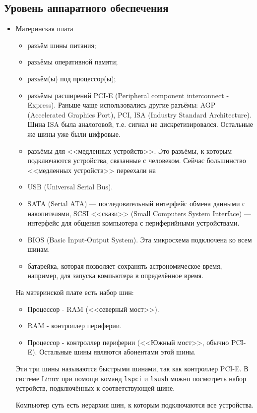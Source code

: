 \subsection{Уровень аппаратного обеспечения}

\begin{itemize}
\item Материнская плата
\begin{itemize}
\item разъём шины питания;
\item разъёмы оперативной памяти;
\item разъём(ы) под процессор(ы);
\item разъёмы расширений PCI-E (Peripheral component interconnect - Express). Раньше чаще использовались другие разъёмы: AGP (Accelerated Graphics Port), PCI, ISA (Industry Standard Architecture). Шина ISA была аналоговой, т.е. сигнал не дискретизировался. Остальные же шины уже были цифровые.
\item разъёмы для <<медленных устройств>>. Это разъёмы, к которым подключаются устройства, связанные с человеком. Сейчас большинство <<медленных устройств>> переехали на
\item USB (Universal Serial Bus).
\item SATA (Serial ATA) --- последовательный интерфейс обмена данными с накопителями, SCSI <<скази>> (Small Computers System Interface) --- интерфейс для общения компьютера с периферийными устройствами.
\item BIOS (Basic Input-Output System). Эта микросхема подключена ко всем шинам. 
\item батарейка, которая позволяет сохранять астрономическое время, например, для запуска компьютера в определённое время.
\end{itemize}
На материнской плате есть набор шин:
\begin{itemize}
\item Процессор - RAM (<<северный мост>>).
\item RAM - контроллер периферии.
\item Процессор - контроллер периферии (<<Южный мост>>, обычно PCI-E). Остальные шины являются абонентами этой шины.
\end{itemize}
Эти три шины называются быстрыми шинами, так как контроллер PCI-E. В системе Linux при помощи команд \verb!lspci! и \verb!lsusb! можно посмотреть набор устройств, подключённых к соответствующей шине.

Компьютер суть есть иерархия шин, к которым подключаются все устройства. 
\end{itemize}

